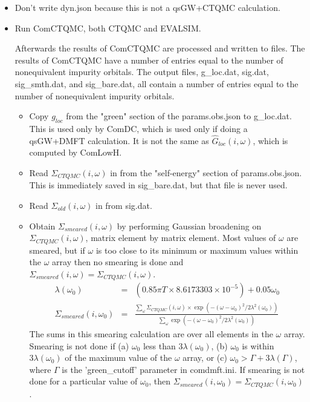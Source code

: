 \documentclass[aps,prb,singlecolumn,preprintnumbers,amsmath,amssymb]{revtex4}
\begin{document}
\begin{itemize}
\item Don't write dyn.json because this is not a qsGW+CTQMC calculation.

\item Run ComCTQMC, both CTQMC and EVALSIM. 

Afterwards the results of ComCTQMC are processed and written to files.  The results of ComCTQMC have a number of entries equal to the number of nonequivalent impurity orbitals.  The output files, g\_loc.dat, sig.dat, sig\_smth.dat, and sig\_bare.dat, all contain a number of entries equal to the number of nonequivalent impurity orbitals. 
\begin{itemize}
\item Copy $g_{loc}$ from the "green" section of the params.obs.json to g\_loc.dat. This is used only by ComDC, which is used only if doing a qsGW+DMFT calculation. It is not the same as $\hat{G}_{loc}(i,\omega)$, which is computed by ComLowH. 
\item Read $\Sigma_{CTQMC}(i,\omega)$ in from  the "self-energy" section of params.obs.json.  This is immediately saved in sig\_bare.dat, but that file is never used.
\item Read $\Sigma_{old}(i,\omega)$ in from sig.dat.
\item Obtain $\Sigma_{smeared}(i,\omega)$ by performing Gaussian broadening on $\Sigma_{CTQMC}(i,\omega)$, matrix element by matrix element.  Most values of $\omega$ are smeared, but if $\omega$ is too close to its minimum or maximum values within the $\omega$ array then no smearing is done and $\Sigma_{smeared}(i,\omega) = \Sigma_{CTQMC}(i,\omega)$.
\begin{eqnarray}
  \lambda(\omega_0) &=&  (0.85 \pi T \times 8.6173303 \times 10^{-5}) + 0.05 \omega_0 \nonumber \\
    \Sigma_{smeared}(i,\omega_0) &=& \frac{
   \sum_{\omega}  \Sigma_{CTQMC}(i,\omega) \times  \exp( -(\omega-\omega_0)^2 / 2 \lambda^2(\omega_0)) } {\sum_{\omega}  \exp( -(\omega-\omega_0)^2 / 2 \lambda^2(\omega_0)) }
    \end{eqnarray}
    The sums in this smearing calculation are over all elements in the $\omega$ array. \\
    Smearing is not done if (a) $\omega_0$  less than $3 \lambda(\omega_0)$, (b) $\omega_0$  is within $3 \lambda(\omega_0)$ of the maximum value of the $\omega$ array, or (c) $\omega_0 > \Gamma + 3 \lambda(\Gamma)$, where $\Gamma$ is the 'green\_cutoff' parameter in comdmft.ini. If smearing is not done for a particular value of $\omega_0$, then $\Sigma_{smeared}(i,\omega_0) = \Sigma_{CTQMC}(i,\omega_0)$. 

\end{itemize}
\end{itemize}
\end{document}
